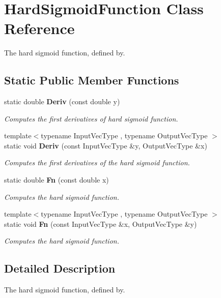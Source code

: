 \section{Hard\+Sigmoid\+Function Class Reference}
\label{classmlpack_1_1ann_1_1HardSigmoidFunction}


The hard sigmoid function, defined by.  


\subsection*{Static Public Member Functions}
\begin{DoxyCompactItemize}
\item 
static double \textbf{ Deriv} (const double y)
\begin{DoxyCompactList}\small\item\em Computes the first derivatives of hard sigmoid function. \end{DoxyCompactList}\item 
{\footnotesize template$<$typename Input\+Vec\+Type , typename Output\+Vec\+Type $>$ }\\static void \textbf{ Deriv} (const Input\+Vec\+Type \&y, Output\+Vec\+Type \&x)
\begin{DoxyCompactList}\small\item\em Computes the first derivatives of the hard sigmoid function. \end{DoxyCompactList}\item 
static double \textbf{ Fn} (const double x)
\begin{DoxyCompactList}\small\item\em Computes the hard sigmoid function. \end{DoxyCompactList}\item 
{\footnotesize template$<$typename Input\+Vec\+Type , typename Output\+Vec\+Type $>$ }\\static void \textbf{ Fn} (const Input\+Vec\+Type \&x, Output\+Vec\+Type \&y)
\begin{DoxyCompactList}\small\item\em Computes the hard sigmoid function. \end{DoxyCompactList}\end{DoxyCompactItemize}


\subsection{Detailed Description}
The hard sigmoid function, defined by. 

